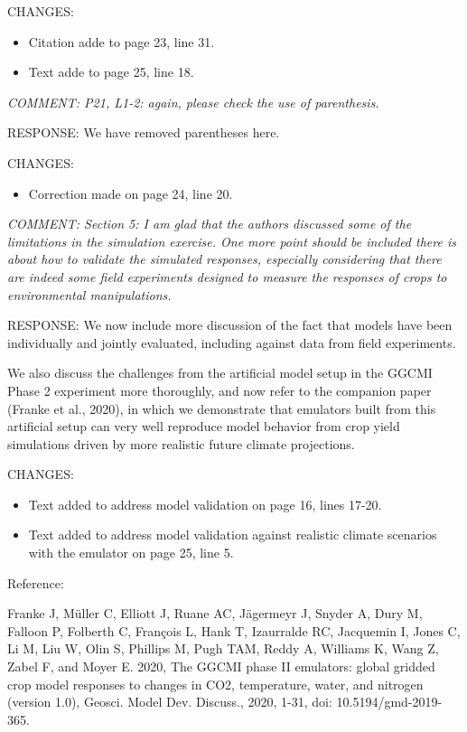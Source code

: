 \documentclass[gmd, manuscript]{copernicus} %
\begin{document}
CHANGES:
\begin{itemize}
    \item Citation adde to page 23, line 31.
    \item Text adde to page 25, line 18.
\end{itemize}

\smallskip

\textcolor{dark-gray}{\textit{COMMENT: P21, L1-2: again, please check the use of parenthesis.}}

RESPONSE: We have removed parentheses here.
\smallskip

CHANGES:
\begin{itemize}
    \item Correction made on page 24, line 20.
\end{itemize}

\smallskip

\textcolor{dark-gray}{\textit{COMMENT: Section 5: I am glad that the authors discussed some of the limitations in the simulation exercise. One more point should be included there is about how to validate the simulated responses, especially considering that there are indeed some field experiments designed to measure the responses of crops to environmental manipulations.}}

RESPONSE: We now include more discussion of the fact that models have been individually and jointly evaluated, including against data from field experiments. 

We also discuss the challenges from the artificial model setup in the GGCMI Phase 2 experiment more thoroughly, and now refer to the companion paper (Franke et al., 2020), in which we demonstrate that emulators built from this artificial setup can very well reproduce model behavior from crop yield simulations driven by more realistic future climate projections.
\smallskip

CHANGES:
\begin{itemize}
    \item Text added to address model validation on page 16, lines 17-20.
    \item Text added to address model validation against realistic climate scenarios with the emulator on page 25, line 5.
\end{itemize}

\smallskip

Reference:

Franke J, Müller C, Elliott J, Ruane AC, Jägermeyr J, Snyder A, Dury M, Falloon P, Folberth C, François L, Hank T, Izaurralde RC, Jacquemin I, Jones C, Li M, Liu W, Olin S, Phillips M, Pugh TAM, Reddy A, Williams K, Wang Z, Zabel F, and Moyer E. 2020, The GGCMI phase II emulators: global gridded crop model responses to changes in CO2, temperature, water, and nitrogen (version 1.0), Geosci. Model Dev. Discuss., 2020, 1-31, doi: 10.5194/gmd-2019-365.
\end{document}
